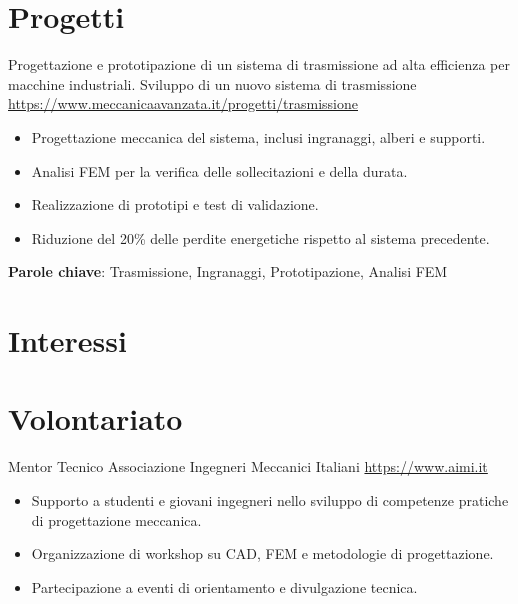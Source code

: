 \documentclass[a4paper, serif, 10pt]{moderncv}
\begin{document}
\section{Progetti}

        {Progettazione e prototipazione di un sistema di trasmissione ad alta efficienza per macchine industriali.}
        {Sviluppo di un nuovo sistema di trasmissione}
        {\url{https://www.meccanicaavanzata.it/progetti/trasmissione}}
        {}
        {\begin{itemize}
\item Progettazione meccanica del sistema, inclusi ingranaggi, alberi e supporti.
\item Analisi FEM per la verifica delle sollecitazioni e della durata.
\item Realizzazione di prototipi e test di validazione.
\item Riduzione del 20\% delle perdite energetiche rispetto al sistema precedente.
\end{itemize}
\textbf{Parole chiave}: Trasmissione, Ingranaggi, Prototipazione, Analisi FEM}
\section{Interessi}

\section{Volontariato}

        {Mentor Tecnico}
        {Associazione Ingegneri Meccanici Italiani}
        {\url{https://www.aimi.it}}
        {}
        {\begin{itemize}
\item Supporto a studenti e giovani ingegneri nello sviluppo di competenze pratiche di progettazione meccanica.
\item Organizzazione di workshop su CAD, FEM e metodologie di progettazione.
\item Partecipazione a eventi di orientamento e divulgazione tecnica.
\end{itemize}}
    
\end{document}
